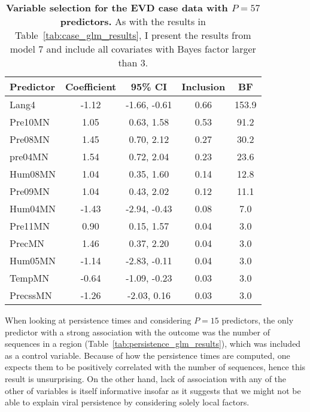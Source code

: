 \begin{minipage}{\textwidth}    
\setcounter{mpfootnote}{\value{footnote}}
\renewcommand{\thempfootnote}{\arabic{mpfootnote}}
\fontsize{9}{11}\selectfont
{}
\begin{longtable}{lcccc}
\caption{\textbf{Variable selection for the EVD case data with $P = 57$ predictors.}
As with the results in Table~\ref{tab:case_glm_results}, I present the results from model 7 and include all covariates with Bayes factor larger than 3.} 
\label{tab:case_bigP_results}\\
\toprule
Predictor\footnotemark[1] & Coefficient\footnotemark[2] & 95\% CI\footnotemark[3] & Inclusion\footnotemark[4] & BF\footnotemark[5] \\
\toprule
Lang4 & -1.12 & -1.66, -0.61 & 0.66 & 153.9 \\
\hline
Pre10MN & 1.05 & 0.63, 1.58 & 0.53 & 91.2 \\
\hline
Pre08MN & 1.45 & 0.70, 2.12 & 0.27 & 30.2 \\
\hline
pre04MN & 1.54 & 0.72, 2.04 & 0.23 & 23.6 \\
\hline
Hum08MN & 1.04 & 0.35, 1.60 & 0.14 & 12.8 \\
\hline
Pre09MN & 1.04 & 0.43, 2.02 & 0.12 & 11.1 \\
\hline
Hum04MN & -1.43 & -2.94, -0.43 & 0.08 & 7.0 \\
\hline
Pre11MN & 0.90 & 0.15, 1.57 & 0.04 & 3.0 \\
\hline
PrecMN & 1.46 & 0.37, 2.20 & 0.04 & 3.0 \\
\hline
Hum05MN & -1.14 & -2.83, -0.11 & 0.04 & 3.0 \\
\hline
TempMN & -0.64 & -1.09, -0.23 & 0.03 & 3.0 \\
\hline
PrecssMN & -1.26 & -2.03, 0.16 & 0.03 & 3.0 \\
\bottomrule
\end{longtable}
\setcounter{footnote}{\value{mpfootnote}}
\end{minipage}

When looking at persistence times and considering $P = 15$ predictors, the only predictor with a strong association with the outcome was the number of sequences in a region (Table~\ref{tab:persistence_glm_results}), which was included as a control variable.
Because of how the persistence times are computed, one expects them to be positively correlated with the number of sequences, hence this result is unsurprising.
On the other hand, lack of association with any of the other of variables is itself informative insofar as it suggests that we might not be  able to explain viral persistence by considering solely local factors.

